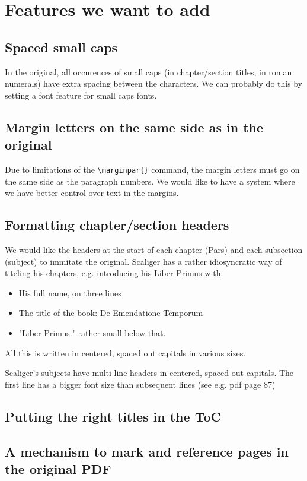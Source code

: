 \documentclass[12pt]{report}
\begin{document}
\chapter{Features we want to add}
\section{Spaced small caps}
In the original, all occurences of small caps (in chapter/section titles, in roman numerals) have extra spacing between
the characters. We can probably do this by setting a font feature for small caps fonts.

\section{Margin letters on the same side as in the original}
Due to limitations of the \verb;\marginpar{}; command, the margin letters must go on the same side as the
paragraph numbers. We would like to have a system where we have better control over text in the margins.

\section{Formatting chapter/section headers}
We would like the headers at the start of each chapter (Pars) and each subsection (subject) to immitate the original.
Scaliger has a rather idiosyncratic way of titeling his chapters, e.g. introducing his Liber Primus with:
\begin{itemize}
\item His full name, on three lines
\item The title of the book: De Emendatione Temporum
\item "Liber Primus." rather small below that.
\end{itemize}
All this is written in centered, spaced out capitals in various sizes.

Scaliger's subjects have multi-line headers in centered, spaced out capitals. The first line has a bigger font size than
subsequent lines (see e.g. pdf page 87)

\section{Putting the right titles in the ToC}

\section{A mechanism to mark and reference pages in the original PDF}
\end{document}
